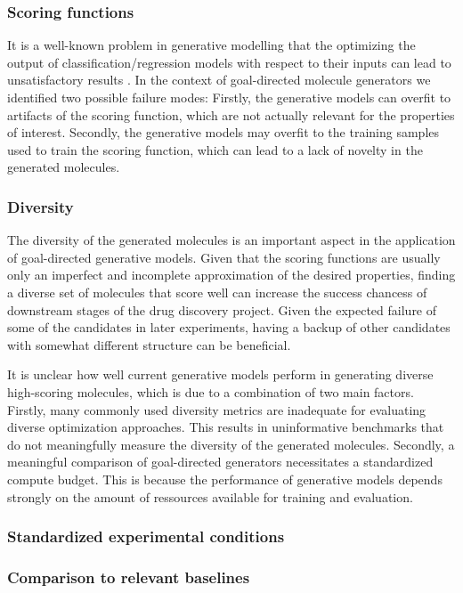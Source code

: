 \subsubsection{Scoring functions}
It is a well-known problem in generative modelling that the optimizing the
output of classification/regression models with respect to their inputs can lead
to unsatisfactory results \citep{todo}. In the context of goal-directed molecule
generators we identified two possible failure modes: Firstly, the generative
models can overfit to artifacts of the scoring function, which are not actually
relevant for the properties of interest. Secondly, the generative models may
overfit to the training samples used to train the scoring function, which can
lead to a lack of novelty in the generated molecules.

\subsubsection{Diversity}
The diversity of the generated molecules is an important aspect in the
application of goal-directed generative models. Given that the scoring functions
are usually only an imperfect and incomplete approximation of the desired
properties, finding a diverse set of molecules that score well can increase the
success chancess of downstream stages of the drug discovery project. Given the
expected failure of some of the candidates in later experiments, having a backup
of other candidates with somewhat different structure can be beneficial.

It is unclear how well current generative models perform in generating diverse
high-scoring molecules, which is due to a combination of two main factors. 
Firstly, many commonly used diversity metrics are inadequate for evaluating
diverse optimization approaches. This results in uninformative benchmarks that
do not meaningfully measure the diversity of the generated molecules. Secondly,
a meaningful comparison of goal-directed generators necessitates a standardized
compute budget. This is because the performance of generative models depends strongly 
on the amount of ressources available for training and evaluation.

\subsubsection{Standardized experimental conditions}

\subsubsection{Comparison to relevant baselines}

